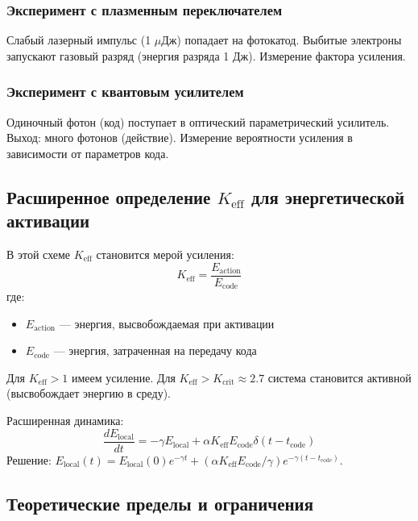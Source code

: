 \documentclass[11pt,a4paper]{article}
\begin{document}
	\subsubsection{Эксперимент с плазменным переключателем}
	Слабый лазерный импульс (1 $\mu$Дж) попадает на фотокатод. Выбитые электроны запускают газовый разряд (энергия разряда 1 Дж). Измерение фактора усиления.
	
	\subsubsection{Эксперимент с квантовым усилителем}
	Одиночный фотон (код) поступает в оптический параметрический усилитель. Выход: много фотонов (действие). Измерение вероятности усиления в зависимости от параметров кода.
	
	\subsection{Расширенное определение $K_{\mathrm{eff}}$ для энергетической активации}
	
	В этой схеме $K_{\mathrm{eff}}$ становится мерой усиления:
	\begin{equation}
		K_{\mathrm{eff}} = \frac{E_{\text{action}}}{E_{\text{code}}}
	\end{equation}
	где:
	\begin{itemize}
		\item $E_{\text{action}}$ — энергия, высвобождаемая при активации
		\item $E_{\text{code}}$ — энергия, затраченная на передачу кода
	\end{itemize}
	
	Для $K_{\mathrm{eff}} > 1$ имеем усиление. Для $K_{\mathrm{eff}} > K_{\text{crit}} \approx 2.7$ система становится активной (высвобождает энергию в среду).
	
	Расширенная динамика:
	\begin{equation}
		\frac{dE_{\text{local}}}{dt} = -\gamma E_{\text{local}} + \alpha K_{\mathrm{eff}} E_{\text{code}} \delta(t - t_{\text{code}})
	\end{equation}
	Решение: $E_{\text{local}}(t) = E_{\text{local}}(0) e^{-\gamma t} + (\alpha K_{\mathrm{eff}} E_{\text{code}}/\gamma) e^{-\gamma(t-t_{\text{code}})}$.
	
	\subsection{Теоретические пределы и ограничения}
	
\end{document}
